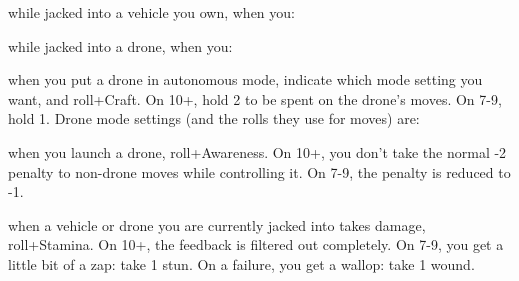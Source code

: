 \newpage



\begin{dossier}
\hspace{.5cm}%
\vrule width 2pt
\hspace{.3cm}%
\begin{dossiermovebar}
\fontsize{9pt}{1em}\selectfont
\setlength{\parskip}{.2cm}


 while jacked into a vehicle you own, when you: 
\begin{moveoptions}


\end{moveoptions}
     while jacked into a drone, when you: 
\begin{moveoptions}



\end{moveoptions}
         when you put a drone in autonomous mode, indicate which 
          mode setting you want, and roll+Craft. On 10+, hold 2 to be spent on the drone’s moves. 
            On 7-9, hold 1. Drone mode settings (and the rolls they use for moves) are: 
\begin{moveoptions}


\end{moveoptions}
             when you launch a drone, roll+Awareness. On 10+, you don’t take 
                the normal -2 penalty to non-drone moves while controlling it. On 7-9, the penalty is 
                reduced to -1. 

                 when a vehicle or drone you are currently jacked into takes damage, 
                  roll+Stamina. On 10+, the feedback is filtered out completely. On 7-9,  you get a little bit of 
                  a zap: take 1 stun. On a failure, you get a wallop: take 1 wound. 


\end{dossiermovebar}
\end{dossier}
